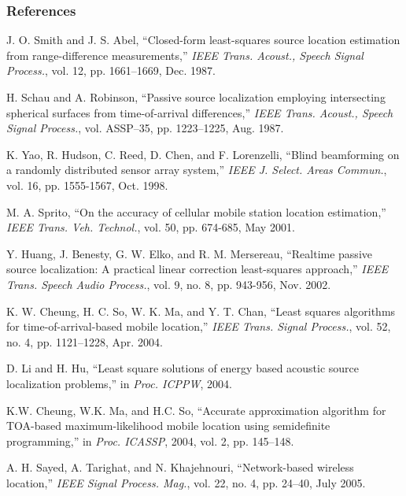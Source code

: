 \begin{frame} [t,allowframebreaks]
\frametitle{References}

%

\begin{thebibliography}{99} 

J. O. Smith and J. S. Abel, ``Closed-form least-squares source location
estimation from range-difference measurements,'' {\em IEEE Trans. Acoust.,
Speech Signal Process.}, vol. 12, pp. 1661--1669, Dec. 1987.

H. Schau and A. Robinson, ``Passive source localization employing intersecting spherical surfaces from time-of-arrival differences,'' {\em IEEE Trans. Acoust., Speech Signal Process.}, vol. ASSP--35, pp. 1223--1225, Aug. 1987.

K. Yao, R. Hudson, C. Reed, D. Chen, and F. Lorenzelli, ``Blind beamforming on a randomly distributed sensor array system,'' {\em IEEE J. Select. Areas Commun.}, vol. 16, pp. 1555-1567, Oct. 1998.

M. A. Sprito, ``On the accuracy of cellular mobile station location estimation,'' {\em IEEE Trans. Veh. Technol.}, vol. 50, pp. 674-685, May 2001.

Y. Huang, J. Benesty, G. W. Elko, and R. M. Mersereau, ``Realtime passive source localization: A practical linear correction least-squares approach,'' {\em IEEE Trans. Speech Audio Process.}, vol. 9, no. 8, pp. 943-956, Nov. 2002.

K. W. Cheung, H. C. So, W. K. Ma, and Y. T. Chan, ``Least squares algorithms for time-of-arrival-based mobile location,'' {\em IEEE Trans. Signal Process.}, vol. 52, no. 4, pp. 1121--1228, Apr. 2004.

D. Li and H. Hu, ``Least square solutions of energy based acoustic source localization problems,'' in {\em Proc. ICPPW}, 2004.

K.W. Cheung, W.K. Ma, and H.C. So, ``Accurate approximation algorithm for TOA-based maximum-likelihood mobile location using semidefinite programming,'' in {\em Proc. ICASSP}, 2004, vol. 2, pp. 145--148.

A. H. Sayed, A. Tarighat, and N. Khajehnouri, ``Network-based wireless location,'' {\em IEEE Signal Process. Mag.}, vol. 22, no. 4, pp. 24--40, July 2005.


\end{thebibliography}
\end{frame}
